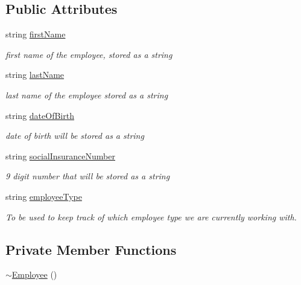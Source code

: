 \subsection*{Public Attributes}
\begin{DoxyCompactItemize}
\item 
string \hyperlink{class_all_employees_1_1_employee_a04c4c16015aa2d889fd2042ce4b8a1d7}{first\+Name}
\begin{DoxyCompactList}\small\item\em first name of the employee, stored as a string \end{DoxyCompactList}\item 
string \hyperlink{class_all_employees_1_1_employee_ac3721b61919ca9cd29a400620562170e}{last\+Name}
\begin{DoxyCompactList}\small\item\em last name of the employee stored as a string \end{DoxyCompactList}\item 
string \hyperlink{class_all_employees_1_1_employee_a258bcc8fcc3ce596ee05f796c2190f59}{date\+Of\+Birth}
\begin{DoxyCompactList}\small\item\em date of birth will be stored as a string \end{DoxyCompactList}\item 
string \hyperlink{class_all_employees_1_1_employee_af589b347b218838839d5d736e3f83ef9}{social\+Insurance\+Number}
\begin{DoxyCompactList}\small\item\em 9 digit number that will be stored as a string \end{DoxyCompactList}\item 
string \hyperlink{class_all_employees_1_1_employee_a246198254823dc5a10197029b17479b4}{employee\+Type}
\begin{DoxyCompactList}\small\item\em To be used to keep track of which employee type we are currently working with. \end{DoxyCompactList}\end{DoxyCompactItemize}
\subsection*{Private Member Functions}
\begin{DoxyCompactItemize}
\item 
\hyperlink{class_all_employees_1_1_employee_a1efba6655fbdcbfdb00ebd76959067b3}{$\sim$\+Employee} ()
\end{DoxyCompactItemize}


